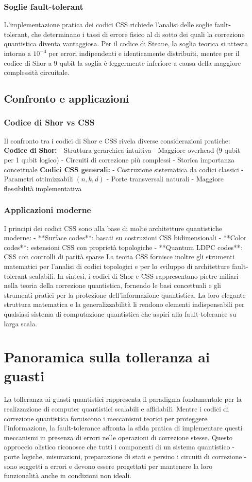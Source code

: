 \documentclass[a4paper,12pt]{report}
\theoremstyle{plain}
\begin{document}
\subsubsection{Soglie fault-tolerant}
L'implementazione pratica dei codici CSS richiede l'analisi delle soglie fault-tolerant, che determinano i tassi di errore fisico al di sotto dei quali la correzione quantistica diventa vantaggiosa.
Per il codice di Steane, la soglia teorica si attesta intorno a $10^{-4}$ per errori indipendenti e identicamente distribuiti, mentre per il codice di Shor a 9 qubit la soglia è leggermente inferiore a causa della maggiore complessità circuitale.
\subsection{Confronto e applicazioni}
\subsubsection{Codice di Shor vs CSS}
Il confronto tra i codici di Shor e CSS rivela diverse considerazioni pratiche:
\textbf{Codice di Shor:}
- Struttura gerarchica intuitiva
- Maggiore overhead (9 qubit per 1 qubit logico)
- Circuiti di correzione più complessi
- Storica importanza concettuale
\textbf{Codici CSS generali:}
- Costruzione sistematica da codici classici
- Parametri ottimizzabili $(n,k,d)$
- Porte transversali naturali
- Maggiore flessibilità implementativa
\subsubsection{Applicazioni moderne}
I principi dei codici CSS sono alla base di molte architetture quantistiche moderne:
- **Surface codes**: basati su costruzioni CSS bidimensionali
- **Color codes**: estensioni CSS con proprietà topologiche
- **Quantum LDPC codes**: CSS con controlli di parità sparse
La teoria CSS fornisce inoltre gli strumenti matematici per l'analisi di codici topologici e per lo sviluppo di architetture fault-tolerant scalabili.
In sintesi, i codici di Shor e CSS rappresentano pietre miliari nella teoria della correzione quantistica, fornendo le basi concettuali e gli strumenti pratici per la protezione dell'informazione quantistica. La loro elegante struttura matematica e la generalizzabilità li rendono elementi indispensabili per qualsiasi sistema di computazione quantistica che aspiri alla fault-tolerance su larga scala.
\section{Panoramica sulla tolleranza ai guasti}
La tolleranza ai guasti quantistici rappresenta il paradigma fondamentale per la realizzazione di computer quantistici scalabili e affidabili. Mentre i codici di correzione quantistica forniscono i meccanismi teorici per proteggere l'informazione, la fault-tolerance affronta la sfida pratica di implementare questi meccanismi in presenza di errori nelle operazioni di correzione stesse. Questo approccio olistico riconosce che tutti i componenti di un sistema quantistico - porte logiche, misurazioni, preparazione di stati e persino i circuiti di correzione - sono soggetti a errori e devono essere progettati per mantenere la loro funzionalità anche in condizioni non ideali.
\end{document}
